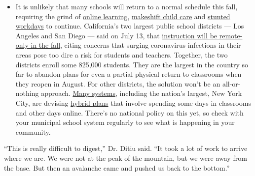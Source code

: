 \begin{itemize}
  \begin{itemize}
  \tightlist
  \item
    It is unlikely that many schools will return to a normal schedule
    this fall, requiring the grind of
    \href{https://www.nytimes.com/2020/06/05/us/coronavirus-education-lost-learning.html?action=click\&pgtype=Article\&state=default\&region=MAIN_CONTENT_3\&context=storylines_faq}{online
    learning},
    \href{https://www.nytimes.com/2020/05/29/us/coronavirus-child-care-centers.html?action=click\&pgtype=Article\&state=default\&region=MAIN_CONTENT_3\&context=storylines_faq}{makeshift
    child care} and
    \href{https://www.nytimes.com/2020/06/03/business/economy/coronavirus-working-women.html?action=click\&pgtype=Article\&state=default\&region=MAIN_CONTENT_3\&context=storylines_faq}{stunted
    workdays} to continue. California's two largest public school
    districts --- Los Angeles and San Diego --- said on July 13, that
    \href{https://www.nytimes.com/2020/07/13/us/lausd-san-diego-school-reopening.html?action=click\&pgtype=Article\&state=default\&region=MAIN_CONTENT_3\&context=storylines_faq}{instruction
    will be remote-only in the fall}, citing concerns that surging
    coronavirus infections in their areas pose too dire a risk for
    students and teachers. Together, the two districts enroll some
    825,000 students. They are the largest in the country so far to
    abandon plans for even a partial physical return to classrooms when
    they reopen in August. For other districts, the solution won't be an
    all-or-nothing approach.
    \href{https://bioethics.jhu.edu/research-and-outreach/projects/eschool-initiative/school-policy-tracker/}{Many
    systems}, including the nation's largest, New York City, are
    devising
    \href{https://www.nytimes.com/2020/06/26/us/coronavirus-schools-reopen-fall.html?action=click\&pgtype=Article\&state=default\&region=MAIN_CONTENT_3\&context=storylines_faq}{hybrid
    plans} that involve spending some days in classrooms and other days
    online. There's no national policy on this yet, so check with your
    municipal school system regularly to see what is happening in your
    community.
  \end{itemize}
\end{itemize}

``This is really difficult to digest,'' Dr. Ditiu said. ``It took a lot
of work to arrive where we are. We were not at the peak of the mountain,
but we were away from the base. But then an avalanche came and pushed us
back to the bottom.''

